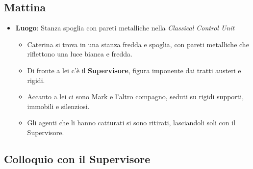 \subsection*{Mattina}

\begin{itemize}
    \item \textbf{Luogo}: Stanza spoglia con pareti metalliche nella \emph{Classical Control Unit}
    \begin{itemize}
        \item Caterina si trova in una stanza fredda e spoglia, con pareti metalliche che riflettono una luce bianca e fredda.
        \item Di fronte a lei c'è il \textbf{Supervisore}, figura imponente dai tratti austeri e rigidi.
        \item Accanto a lei ci sono Mark e l'altro compagno, seduti su rigidi supporti, immobili e silenziosi.
        \item Gli agenti che li hanno catturati si sono ritirati, lasciandoli soli con il Supervisore.
    \end{itemize}
\end{itemize}

\subsection*{Colloquio con il Supervisore}

